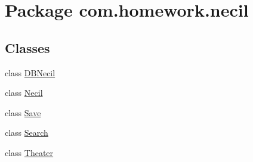 \hypertarget{namespacecom_1_1homework_1_1necil}{}\section{Package com.\+homework.\+necil}
\label{namespacecom_1_1homework_1_1necil}
\subsection*{Classes}
\begin{DoxyCompactItemize}
\item 
class \hyperlink{classcom_1_1homework_1_1necil_1_1_d_b_necil}{D\+B\+Necil}
\item 
class \hyperlink{classcom_1_1homework_1_1necil_1_1_necil}{Necil}
\item 
class \hyperlink{classcom_1_1homework_1_1necil_1_1_save}{Save}
\item 
class \hyperlink{classcom_1_1homework_1_1necil_1_1_search}{Search}
\item 
class \hyperlink{classcom_1_1homework_1_1necil_1_1_theater}{Theater}
\end{DoxyCompactItemize}

